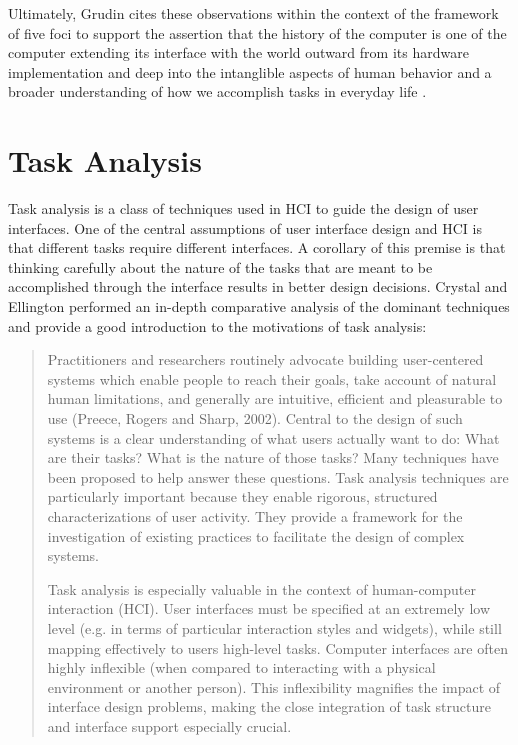 Ultimately, Grudin cites these observations within the context of the framework of five foci to support the assertion that the history of the computer is one of the computer extending its interface with the world outward from its hardware implementation and deep into the intanglible aspects of human behavior and a broader understanding of how we accomplish tasks in everyday life \cite{continuity1990}.

\section{Task Analysis}

Task analysis is a class of techniques used in HCI to guide the design of user interfaces. One of the central assumptions of user interface design and HCI is that different tasks require different interfaces. A corollary of this premise is that thinking carefully about the nature of the tasks that are meant to be accomplished through the interface results in better design decisions. Crystal and Ellington performed an in-depth comparative analysis of the dominant techniques and provide a good introduction to the motivations of task analysis:

\begin{quote}
Practitioners and researchers routinely advocate building user-centered systems which enable people to reach their goals, take account of natural human limitations, and generally are intuitive, efficient and pleasurable to use (Preece, Rogers and Sharp, 2002). Central to the design of such systems is a clear understanding of what users actually want to do: What are their tasks? What is the nature of those tasks? Many techniques have been proposed to help answer these questions. Task analysis techniques are particularly important because they enable rigorous, structured characterizations of user activity. They provide a framework for the investigation of existing practices to facilitate the design of complex systems.

Task analysis is especially valuable in the context of human-computer interaction (HCI). User interfaces must be specified at an extremely low level (e.g. in terms of particular interaction styles and widgets), while still mapping effectively to users high-level tasks. Computer interfaces are often highly inflexible (when compared to interacting with a physical environment or another person). This inflexibility magnifies the impact of interface design problems, making the close integration of task structure and interface support especially crucial. \cite{crystal2004}
\end{quote}

